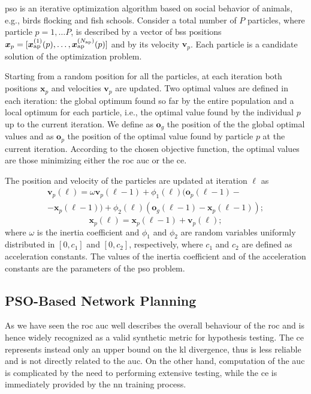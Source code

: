 \documentclass[conference,draftcls,onecolumn]{IEEEtran}
\begin{document}
\ac{pso} is an iterative optimization algorithm based on social behavior of animals, e.g., birds flocking and fish schools. Consider a total number of $P$ particles, where  particle $p=1, \ldots P$, is described by a vector of \acp{bs} positions $\bm{x}_p = [\bm{x}_{\rm ap}^{(1)}(p),\ldots, \bm{x}_{\rm ap}^{(N_{\rm ap})}(p)]$ and by its velocity $\bm{v}_p$.  Each particle is a candidate solution of the optimization problem. 

Starting from a random position for all the particles, at each iteration both  positions $\bm{x}_p$ and  velocities $\bm{v}_p$ are updated. Two optimal values are defined in each iteration: the global optimum found so far by the entire population and a local optimum for each particle, i.e., the optimal value found by the individual $p$ up to the current iteration. We define as $\bm{o}_g$ the position of the the global optimal values and as $\bm{o}_p$ the position of the optimal value found by particle $p$ at the current iteration. According to the chosen objective function, the optimal values are those minimizing either the \ac{roc} \ac{auc} or  the \ac{ce}.

The position and velocity of the particles are updated at iteration $\ell$ as \cite{Kennedy-11}
   \begin{equation}\label{eq: v up}
\begin{split}
  \bm{v}_p(\ell) = \omega \bm{v}_p(\ell-1)+\phi_1(\ell)(\bm{o}_p(\ell-1)-\\
  -\bm{x}_p(\ell-1))+\phi_2(\ell)(\bm{o}_g(\ell-1)-\bm{x}_p(\ell-1));
  \end{split}
  \end{equation}
  \begin{equation}\label{eq: p up}
  \bm{x}_p(\ell) = \bm{x}_p(\ell-1) + \bm{v}_p(\ell);
 \end{equation}
where $\omega$ is the inertia coefficient and $\phi_1$ and $\phi_2$ are random variables uniformly distributed in $[0,c_1]$ and $[0,c_2]$, respectively, where $c_1$ and $c_2$ are defined as acceleration constants. The values of the inertia coefficient and of the acceleration constants are the parameters of the \ac{pso} problem.

\subsection{PSO-Based Network Planning}

As we have seen the \ac{roc} \ac{auc} well describes the overall behaviour of the \ac{roc} and is hence widely recognized as a valid synthetic metric for hypothesis testing. The \ac{ce} represents instead only an upper bound on the \ac{kl} divergence, thus is less reliable and is not directly related to the \ac{auc}. On the other hand, computation of the \ac{auc} is complicated by the need to performing extensive testing, while the \ac{ce} is immediately provided by the \ac{nn} training process. 
\end{document}
